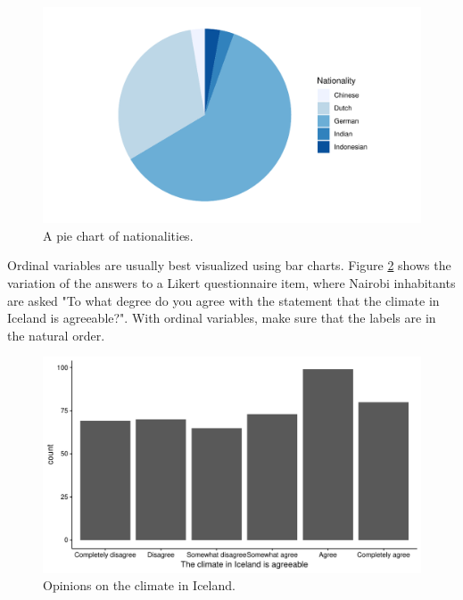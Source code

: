 \documentclass[]{book}\usepackage[]{graphicx}\usepackage[]{color}
\makeatletter
\def\maxwidth{ %
  \ifdim\Gin@nat@width>\linewidth
    \linewidth
  \else
    \Gin@nat@width
  \fi
}
\newenvironment{knitrout}{}{} %
\makeatother
\begin{document}
\begin{knitrout}
\color{fgcolor}\begin{figure}

{\centering \includegraphics[width=\maxwidth]{figure/nationality_3-1} 

}

\caption[A pie chart of nationalities]{A pie chart of nationalities.}\label{fig:nationality_3}
\end{figure}


\end{knitrout}


Ordinal variables are usually best visualized using bar charts. Figure \ref{fig:climate_1} shows the variation of the answers to a Likert questionnaire item, where Nairobi inhabitants are asked "To what degree do you agree with the statement that the climate in Iceland is agreeable?". With ordinal variables, make sure that the labels are in the natural order. 

\begin{figure}

{\centering \includegraphics[width=\maxwidth]{figure/climate_1-1} 

}

\caption[Opinions on the climate in Iceland]{Opinions on the climate in Iceland.}\label{fig:climate_1}
\end{figure}
\end{document}
